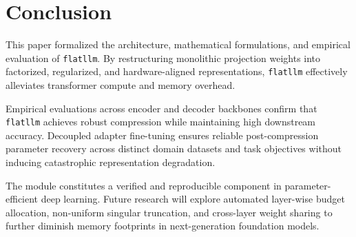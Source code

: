 \section{Conclusion}
This paper formalized the architecture, mathematical formulations, and empirical evaluation of \texttt{flatllm}. By restructuring monolithic projection weights into factorized, regularized, and hardware-aligned representations, \texttt{flatllm} effectively alleviates transformer compute and memory overhead.

Empirical evaluations across encoder and decoder backbones confirm that \texttt{flatllm} achieves robust compression while maintaining high downstream accuracy. Decoupled adapter fine-tuning ensures reliable post-compression parameter recovery across distinct domain datasets and task objectives without inducing catastrophic representation degradation.

The module constitutes a verified and reproducible component in parameter-efficient deep learning. Future research will explore automated layer-wise budget allocation, non-uniform singular truncation, and cross-layer weight sharing to further diminish memory footprints in next-generation foundation models.

